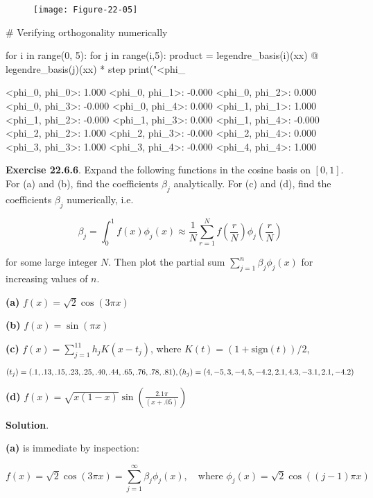 \begin{figure}[H]
\centering
\texttt{[image: Figure-22-05]}
\end{figure}

\begin{python}
# Verifying orthogonality numerically

for i in range(0, 5):
    for j in range(i,5):
        product = legendre_basis(i)(xx) @ legendre_basis(j)(xx) * step
        print("<phi_%
\end{python}

\begin{console}
<phi\_{0}, phi\_{0}>: 1.000
<phi\_{0}, phi\_{1}>: -0.000
<phi\_{0}, phi\_{2}>: 0.000
<phi\_{0}, phi\_{3}>: -0.000
<phi\_{0}, phi\_{4}>: 0.000
<phi\_{1}, phi\_{1}>: 1.000
<phi\_{1}, phi\_{2}>: -0.000
<phi\_{1}, phi\_{3}>: 0.000
<phi\_{1}, phi\_{4}>: -0.000
<phi\_{2}, phi\_{2}>: 1.000
<phi\_{2}, phi\_{3}>: -0.000
<phi\_{2}, phi\_{4}>: 0.000
<phi\_{3}, phi\_{3}>: 1.000
<phi\_{3}, phi\_{4}>: -0.000
<phi\_{4}, phi\_{4}>: 1.000
\end{console}

\textbf{Exercise 22.6.6}. Expand the following functions in the cosine
basis on \([0, 1]\). For (a) and (b), find the coefficients \(\beta_{j}\)
analytically. For (c) and (d), find the coefficients \(\beta_{j}\)
numerically, i.e.

\[ \beta_{j} = \int_{0}^{1} f(x) \phi_{j}(x) \approx \frac{1}{N} \sum_{r=1}^N f \left( \frac{r}{N} \right) \phi_{j} \left( \frac{r}{N} \right) \]

for some large integer \(N\). Then plot the partial sum
\(\sum_{j=1}^{n} \beta_{j} \phi_{j}(x)\) for increasing values of \(n\).

\textbf{(a)} \(f(x) = \sqrt{2} \cos (3 \pi x)\)

\textbf{(b)} \(f(x) = \sin(\pi x)\)

\textbf{(c)} \(f(x) = \sum_{j=1}^{11} h_{j} K(x - t_{j})\), where
\(K(t) = (1 + \text{sign}(t)) / 2\),

\[ 
(t_{j}) = (.1, .13, .15, .23, .25, .40, .44, .65, .76, .78, .81), \\
(h_{j}) = (4, -5, 3, -4, 5, -4.2, 2.1, 4.3, -3.1, 2.1, -4.2)
\]

\textbf{(d)} $f(x) = \sqrt{x(1-x)} \sin \left(
\frac{2.1 \pi}{(x + .05)} \right) $

\textbf{Solution}.

\textbf{(a)} is immediate by inspection:

\[ f(x) = \sqrt{2} \cos(3 \pi x) = \sum_{j=1}^{\infty} \beta_{j} \phi_{j}(x), \quad \text{where } \phi_{j}(x) = \sqrt{2} \cos((j - 1) \pi x) \]

